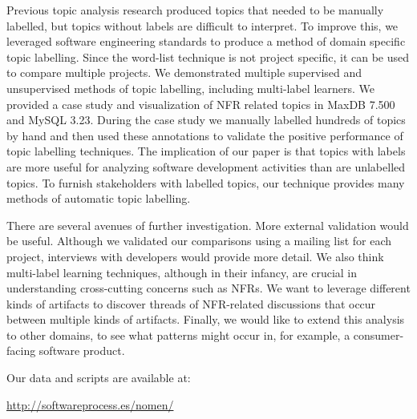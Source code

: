 \documentclass[]{sig-alternate}
\begin{document}


Previous topic analysis research produced topics that needed to be manually labelled, but topics without labels are difficult to interpret.
To improve this, we leveraged software engineering standards to produce a method of domain specific topic labelling.
Since the word-list technique is not project specific, it can be used to compare multiple projects.
We demonstrated multiple supervised and unsupervised methods of topic labelling, including multi-label learners.
We provided a case study and visualization of NFR related topics in MaxDB 7.500 and MySQL 3.23. 
During the case study we manually labelled hundreds of topics by hand and then used these annotations to validate the positive performance of topic labelling techniques.
The implication of our paper is that topics with labels are more useful for analyzing software development activities than are unlabelled topics. To furnish stakeholders with labelled topics, our technique provides many methods of automatic topic labelling.

 
There are several avenues of further investigation.  
More external validation would be useful. 
Although we validated our comparisons using a mailing list for each project, interviews with developers would provide more detail. 
We also think multi-label learning techniques, although in their infancy, are crucial in understanding cross-cutting concerns such as NFRs. 
We want to leverage different kinds of artifacts to discover threads of NFR-related discussions that occur between multiple kinds of artifacts.
Finally, we would like to extend this analysis to other domains, to see what patterns might occur in, for example, a consumer-facing software product.
 

\appendix

Our data and scripts are available at:

 \url{http://softwareprocess.es/nomen/}


%

\end{document}
